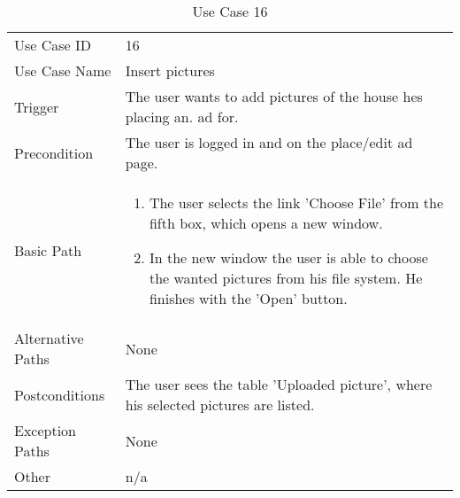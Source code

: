 \begin{table}[H]
\centering
\label{table-use-case-16}
\begin{tabular}{|p{3cm}|p{10cm}}
Use Case ID       & 16                                                      \\
Use Case Name     & Insert pictures                            \\
Trigger           & The user wants to add pictures of the house hes placing an.
ad for. \\ 
Precondition      & The user is logged in and on the place/edit ad page.            
\\
Basic Path        & \begin{enumerate}
\item		The user selects the link 'Choose File' from the fifth box, which opens a
new window.
\item       In the new window the user is able to choose the wanted pictures
			from his file system. He finishes with the 'Open' button.
\end{enumerate} 
     \\
Alternative Paths & None                          \\
Postconditions    & The user sees the table 'Uploaded picture', where his
selected pictures are listed.
\\
Exception Paths   & None			\\
Other             & n/a                                                                                                                                                                                                        
\end{tabular}
\caption{Use Case 16}
\end{table}




